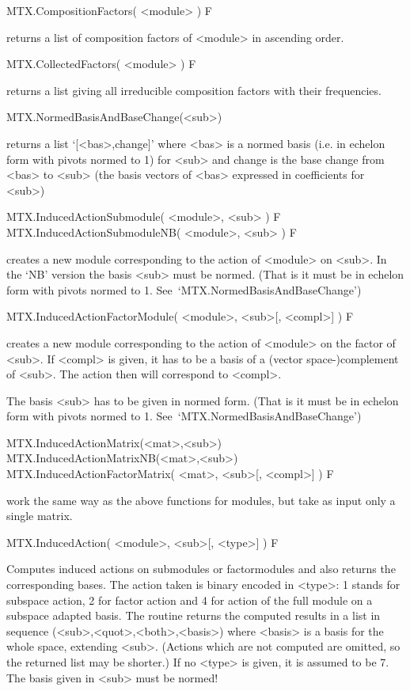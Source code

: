 \>MTX.CompositionFactors( <module> ) F

returns a list of composition factors of <module> in ascending order.

\>MTX.CollectedFactors( <module> ) F

returns a list giving all irreducible composition factors with their
frequencies.


\>MTX.NormedBasisAndBaseChange(<sub>)

returns a list `[<bas>,change]' where <bas> is a normed basis (i.e. in
echelon form with pivots normed to 1) for <sub> and change is the base change
from <bas> to <sub> (the basis vectors of <bas> expressed in coefficients for
<sub>)


\>MTX.InducedActionSubmodule( <module>, <sub> ) F
\>MTX.InducedActionSubmoduleNB( <module>, <sub> ) F

creates a new module corresponding to the action of <module> on <sub>. In
the `NB' version the basis <sub> must be normed. (That is it must be in
echelon form with pivots normed to 1. See~`MTX.NormedBasisAndBaseChange')

\>MTX.InducedActionFactorModule( <module>, <sub>[, <compl>] ) F

creates a new module corresponding to the action of <module> on the
factor of <sub>. If <compl> is given, it has to be a basis of a
(vector space-)complement of <sub>. The action then will correspond to
<compl>.

The basis <sub> has to be given in normed form. (That is it must be in
echelon form with pivots normed to 1. See~`MTX.NormedBasisAndBaseChange')

\>MTX.InducedActionMatrix(<mat>,<sub>)
\>MTX.InducedActionMatrixNB(<mat>,<sub>)
\>MTX.InducedActionFactorMatrix( <mat>, <sub>[, <compl>] ) F

work the same way as the above functions for modules, but take as input only
a single matrix.

\>MTX.InducedAction( <module>, <sub>[, <type>] ) F

Computes induced actions on submodules or factormodules and also returns the
corresponding bases. The action taken is binary encoded in <type>:
1 stands for subspace action, 2 for
factor action and 4 for action of the full module
on a subspace adapted basis.
The routine returns the computed results in a list in sequence
(<sub>,<quot>,<both>,<basis>) where <basis> is a basis for the whole space,
extending <sub>. (Actions which are not computed are omitted, so the
returned list may be shorter.)
If no <type> is given, it is assumed to be 7.
The basis given in <sub> must be normed!


